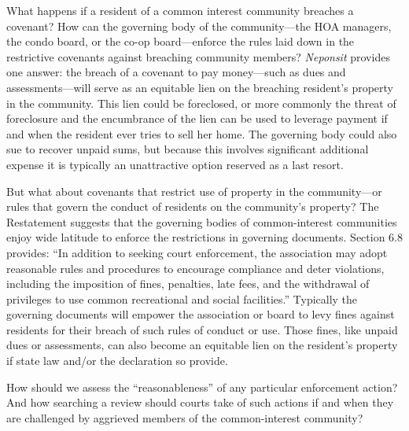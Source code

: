 What happens if a resident of a common interest community breaches a covenant?
How can the governing body of the community---the HOA managers, the condo board,
or the co-op board---enforce the rules laid down in the restrictive covenants
against breaching community members? \textit{Neponsit} provides one answer: the
breach of a covenant to pay money---such as dues and assessments---will serve as
an equitable lien on the breaching resident's property in the community. This
lien could be foreclosed, or more commonly the threat of foreclosure and the
encumbrance of the lien can be used to leverage payment if and when the resident
ever tries to sell her home. The governing body could also sue to recover unpaid
sums, but because this involves significant additional expense it is typically
an unattractive option reserved as a last resort.

But what about covenants that restrict use of property in the community---or
rules that govern the conduct of residents on the community's property? The
Restatement suggests that the governing bodies of common-interest communities
enjoy wide latitude to enforce the restrictions in governing documents. Section
6.8 provides: ``In addition to seeking court enforcement, the association may
adopt reasonable rules and procedures to encourage compliance and deter
violations, including the imposition of fines, penalties, late fees, and the
withdrawal of privileges to use common recreational and social facilities.''
Typically the governing documents will empower the association or board to levy
fines against residents for their breach of such rules of conduct or use. Those
fines, like unpaid dues or assessments, can also become an equitable lien on the
resident's property if state law and/or the declaration so provide.

How should we assess the ``reasonableness'' of any particular enforcement
action? And how searching a review should courts take of such actions if and
when they are challenged by aggrieved members of the common-interest community?

